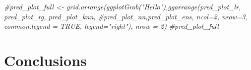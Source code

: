 \documentclass[
]{article}
\newenvironment{Shaded}{\begin{snugshade}}{\end{snugshade}}
\newcommand{\CommentTok}[1]{\textcolor[rgb]{0.56,0.35,0.01}{\textit{#1}}}
\begin{document}
\begin{Shaded}
\begin{Highlighting}[]
\CommentTok{\#pred\_plot\_full \textless{}{-} grid.arrange(ggplotGrob("Hello"),ggarrange(pred\_plot\_lr, pred\_plot\_rg, pred\_plot\_knn, \#pred\_plot\_nn,pred\_plot\_ens, ncol=2, nrow=3, common.legend = TRUE, legend="right"), nrow = 2)}
\CommentTok{\#pred\_plot\_full}
\end{Highlighting}
\end{Shaded}

\hypertarget{conclusions}{%
\section{Conclusions}\label{conclusions}}
\end{document}
